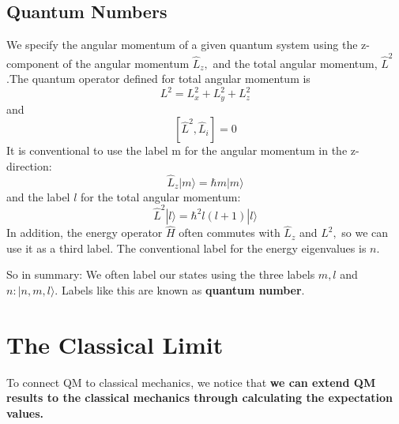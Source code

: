 \subsection{Quantum Numbers}
We specify the angular momentum of a given quantum system using the z-component of the angular momentum $\hat{L}_{z},$ and the total angular momentum, $\hat{L}^{2}$.The quantum operator defined for total angular momentum is 
\begin{equation}
L^{2}=L_{x}^{2}+L_{y}^{2}+L_{z}^{2}
\end{equation}
and
\begin{equation}
\left[\hat{L}^{2}, \hat{L}_{i}\right]=0
\end{equation}
It is conventional to use the label m for the angular momentum in the z-direction:
\begin{equation}
\hat{L}_{z}|m\rangle=\hbar m|m\rangle
\end{equation}
and the label $l$ for the total angular momentum:
\begin{equation}
\hat{L}^{2}|l\rangle=\hbar^{2} l(l+1)|l\rangle
\end{equation}
In addition, the energy operator $\hat{H}$ often commutes with $\hat{L}_{z}$ and $L^{2},$ so we can use it as a third label. The conventional label for the energy eigenvalues is $n$.

So in summary: We often label our states using the three labels $m, l$ and $n:|n, m, l\rangle .$ Labels like this are known as \textbf{quantum number}.

\section{The Classical Limit}
To connect QM to classical mechanics, we notice that \textbf{we can extend QM results to the classical mechanics through calculating the expectation values.}

